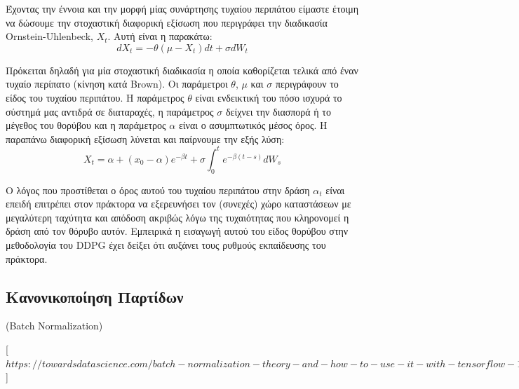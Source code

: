 \documentclass[11pt]{article} %
\numberwithin{equation}{subsection}
\begin{document}
Έχοντας την έννοια και την μορφή μίας συνάρτησης τυχαίου περιπάτου είμαστε έτοιμη να δώσουμε την στοχαστική διαφορική εξίσωση που περιγράφει την διαδικασία Ornstein-Uhlenbeck, $X_t$. Αυτή είναι η παρακάτω:\\
\begin{equation}
dX_t = -\theta(\mu - X_t)dt + \sigma dW_t
\end{equation}

Πρόκειται δηλαδή για μία στοχαστική διαδικασία η οποία καθορίζεται τελικά από έναν τυχαίο περίπατο (κίνηση κατά Brown). Οι παράμετροι $\theta$, $\mu$ και $\sigma$ περιγράφουν το είδος του τυχαίου περιπάτου. Η παράμετρος $\theta$ είναι ενδεικτική του πόσο ισχυρά το σύστημά μας αντιδρά σε διαταραχές, η παράμετρος $\sigma$ δείχνει την διασπορά ή το μέγεθος του θορύβου και η παράμετρος $\alpha$ είναι ο ασυμπτωτικός μέσος όρος. Η παραπάνω διαφορική εξίσωση λύνεται και παίρνουμε την εξής λύση: \\
\begin{equation}
X_t = \alpha + (x_0 - \alpha) e^{-\beta t} + \sigma \int_{0}^{t} e^{-\beta (t - s)} dW_s
\end{equation}

Ο λόγος που προστίθεται ο όρος αυτού του τυχαίου περιπάτου στην δράση $\alpha_t$ είναι επειδή επιτρέπει στον πράκτορα να εξερευνήσει τον (συνεχές) χώρο καταστάσεων με μεγαλύτερη ταχύτητα και απόδοση ακριβώς λόγω της τυχαιότητας που κληρονομεί η δράση από τον θόρυβο αυτόν. Εμπειρικά η εισαγωγή αυτού του είδος θορύβου στην μεθοδολογία του DDPG έχει δείξει ότι αυξάνει τους ρυθμούς εκπαίδευσης του πράκτορα.\\

\subsection{Κανονικοποίηση Παρτίδων} (Batch Normalization)

[$https://towardsdatascience.com/batch-normalization-theory-and-how-to-use-it-with-tensorflow-1892ca0173ad και https://arxiv.org/pdf/1502.03167.pdf$]
\end{document}
